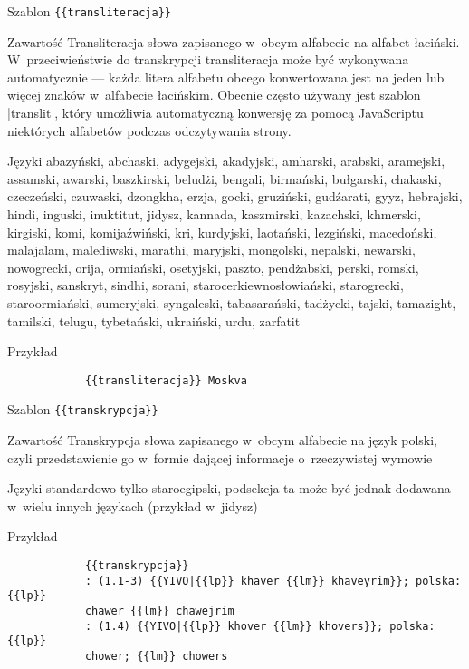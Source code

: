 \begin{opis}
	\item[Szablon] \verb|{{transliteracja}}|
	\item[Zawartość] Transliteracja słowa zapisanego w~obcym alfabecie na alfabet łaciński. \\ W~przeciwieństwie do transkrypcji transliteracja może być wykonywana automatycznie --- każda litera alfabetu obcego konwertowana jest na jeden lub więcej znaków w~alfabecie łacińskim. Obecnie często używany jest szablon \kod|{{translit}}|, który umożliwia automatyczną konwersję za pomocą JavaScriptu niektórych alfabetów podczas odczytywania strony.
	\item[Języki] abazyński, abchaski, adygejski, akadyjski, amharski, arabski, aramejski, assamski, awarski, baszkirski, beludżi, bengali, birmański, bułgarski, chakaski, czeczeński, czuwaski, dzongkha, erzja, gocki, gruziński, gudźarati, gyyz, hebrajski, hindi, inguski, inuktitut, jidysz, kannada, kaszmirski, kazachski, khmerski, kirgiski, komi, komi\dywiz{}jaźwiński, kri, kurdyjski, laotański, lezgiński, macedoński, malajalam, malediwski, marathi, maryjski, mongolski, nepalski, newarski, nowogrecki, orija, ormiański, osetyjski, paszto, pendżabski, perski, romski, rosyjski, sanskryt, sindhi, sorani, staro\dywiz{}cerkiewno\dywiz{}słowiański, starogrecki, staroormiański, sumeryjski, syngaleski, tabasarański, tadżycki, tajski, tamazight, tamilski, telugu, tybetański, ukraiński, urdu, zarfatit
	\item[Przykład]
		\begin{verbatim}
			{{transliteracja}} Moskva
		\end{verbatim}
\end{opis}
\spacer
\begin{opis}
	\item[Szablon] \verb|{{transkrypcja}}|
	\item[Zawartość] Transkrypcja słowa zapisanego w~obcym alfabecie na język polski, czyli przedstawienie go w~formie dającej informacje o~rzeczywistej wymowie
	\item[Języki] standardowo tylko staroegipski, podsekcja ta może być jednak dodawana w~wielu innych językach (przykład w~jidysz)
	\item[Przykład]
		\begin{verbatim}
			{{transkrypcja}}
			: (1.1-3) {{YIVO|{{lp}} khaver {{lm}} khaveyrim}}; polska: {{lp}}
			chawer {{lm}} chawejrim
			: (1.4) {{YIVO|{{lp}} khover {{lm}} khovers}}; polska: {{lp}}
			chower; {{lm}} chowers
		\end{verbatim}
\end{opis}

